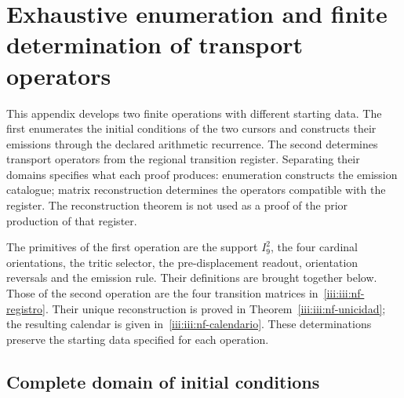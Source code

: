 \section{Exhaustive enumeration and finite determination of transport operators}
\label{iii:iii:nucleo-finito}

This appendix develops two finite operations with different starting
data. The first enumerates the initial conditions of the two cursors
and constructs their emissions through the declared arithmetic recurrence.
The second determines transport operators from the regional
transition register. Separating their domains specifies
what each proof produces: enumeration constructs the emission
catalogue; matrix reconstruction determines the operators compatible
with the register. The reconstruction theorem is not used as a proof
of the prior production of that register.

The primitives of the first operation are the support $I_9^2$, the four
cardinal orientations, the tritic selector, the pre-displacement readout,
orientation reversals and the emission rule.
Their definitions are brought together below. Those of the second operation are the
four transition matrices in~\eqref{iii:iii:nf-registro}.
Their unique reconstruction is proved in
Theorem~\ref{iii:iii:nf-unicidad}; the resulting calendar is given
in~\eqref{iii:iii:nf-calendario}. These determinations preserve
the starting data specified for each operation.

\subsection{Complete domain of initial conditions}

